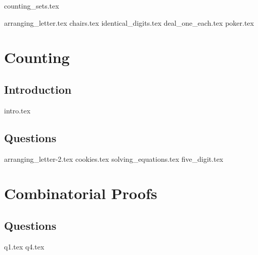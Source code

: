 \documentclass{exam}
\begin{document}
{counting_sets.tex}
\begin{questions}
{arranging_letter.tex}
{chairs.tex}
{identical_digits.tex} 
{deal_one_each.tex}
{poker.tex}

\end{questions}

\section{Counting}
\subsection{Introduction}
{intro.tex}
\subsection{Questions}
\begin{questions}
{arranging_letter-2.tex}
{cookies.tex}
{solving_equations.tex}
{five_digit.tex}
\end{questions}

\section{Combinatorial Proofs}
\subsection{Questions}
\begin{questions}
 {q1.tex}
{q4.tex}
\end{questions}
\end{document}
